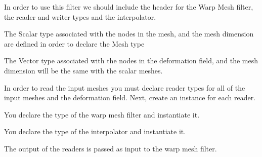 \documentclass{InsightArticle}
\begin{document}
In order to use this filter we should include the header for the Warp Mesh filter, the reader and writer
types and the interpolator.

\begin{center}

\end{center}

The Scalar type associated with the nodes in the mesh, and the mesh dimension
are defined in order to declare the Mesh type

\begin{center}

\end{center}

The Vector type associated with the nodes in the deformation field, and the mesh dimension
will be the same with the scalar meshes.

\begin{center}

\end{center}

In order to read the input meshes you must declare reader types for all of the input meshes
and the deformation field. Next, create an instance for each reader.

\begin{center}

\end{center}

You declare the type of the warp mesh filter and instantiate it.

\begin{center}

\end{center}

You declare the type of the interpolator and instantiate it.

\begin{center}

\end{center}

The output of the readers is passed as input to the warp mesh filter.

\begin{center}

\end{center}
\end{document}

